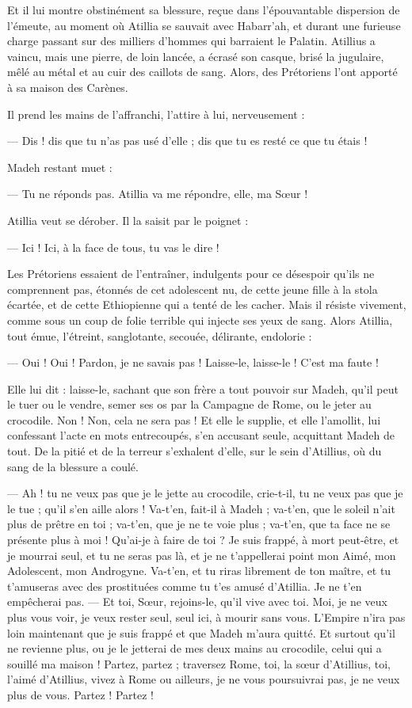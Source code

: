 \documentclass[a4paper, 11pt, oneside, polutonikogreek, french]{article}
\begin{document}
Et il lui montre obstinément sa blessure, reçue dans l'épouvantable dispersion de l'émeute, au moment où Atillia se sauvait avec Habarr'ah, et durant une furieuse charge passant sur des milliers d'hommes qui barraient le Palatin. Atillius a vaincu, mais une pierre, de loin lancée, a écrasé son casque, brisé la jugulaire, mêlé au métal et au cuir des caillots de sang. Alors, des Prétoriens l'ont apporté à sa maison des Carènes.

Il prend les mains de l'affranchi, l'attire à lui, nerveusement :

--- Dis ! dis que tu n'as pas usé d'elle ; dis que tu es resté ce que tu étais !

Madeh restant muet :

--- Tu ne réponds pas. Atillia va me répondre, elle, ma Sœur !

Atillia veut se dérober. Il la saisit par le poignet :

--- Ici ! Ici, à la face de tous, tu vas le dire !

Les Prétoriens essaient de l'entraîner, indulgents pour ce désespoir qu'ils ne comprennent pas, étonnés de cet adolescent nu, de cette jeune fille à la stola écartée, et de cette Ethiopienne qui a tenté de les cacher. Mais il résiste vivement, comme sous un coup de folie terrible qui injecte ses yeux de sang. Alors Atillia, tout émue, l'étreint, sanglotante, secouée, délirante, endolorie :

--- Oui ! Oui ! Pardon, je ne savais pas ! Laisse-le, laisse-le ! C'est ma faute !

Elle lui dit : laisse-le, sachant que son frère a tout pouvoir sur Madeh, qu'il peut le tuer ou le vendre, semer ses os par la Campagne de Rome, ou le jeter au crocodile. Non ! Non, cela ne sera pas ! Et elle le supplie, et elle l'amollit, lui confessant l'acte en mots entrecoupés, s'en accusant seule, acquittant Madeh de tout. De la pitié et de la terreur s'exhalent d'elle, sur le sein d'Atillius, où du sang de la blessure a coulé.

--- Ah ! tu ne veux pas que je le jette au crocodile, crie-t-il, tu ne veux pas que je le tue ; qu'il s'en aille alors ! Va-t'en, fait-il à Madeh ; va-t'en, que le soleil n'ait plus de prêtre en toi ; va-t'en, que je ne te voie plus ; va-t'en, que ta face ne se présente plus à moi ! Qu'ai-je à faire de toi ? Je suis frappé, à mort peut-être, et je mourrai seul, et tu ne seras pas là, et je ne t'appellerai point mon Aimé, mon Adolescent, mon Androgyne. Va-t'en, et tu riras librement de ton maître, et tu t'amuseras avec des prostituées comme tu t'es amusé d'Atillia. Je ne t'en empêcherai pas. --- Et toi, Sœur, rejoins-le, qu'il vive avec toi. Moi, je ne veux plus vous voir, je veux rester seul, seul ici, à mourir sans vous. L'Empire n'ira pas loin maintenant que je suis frappé et que Madeh m'aura quitté. Et surtout qu'il ne revienne plus, ou je le jetterai de mes deux mains au crocodile, celui qui a souillé ma maison ! Partez, partez ; traversez Rome, toi, la sœur d'Atillius, toi, l'aimé d'Atillius, vivez à Rome ou ailleurs, je ne vous poursuivrai pas, je ne veux plus de vous. Partez ! Partez !
\end{document}
